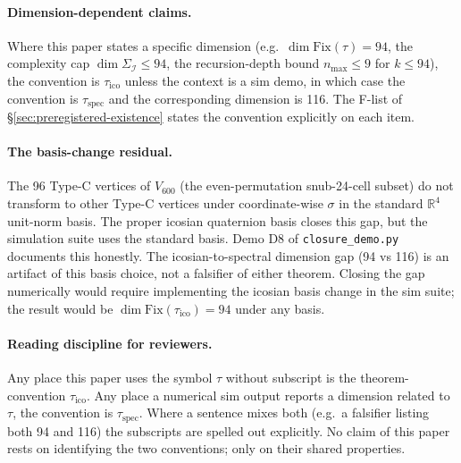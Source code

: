 \documentclass[11pt]{article}
\theoremstyle{plain}
\theoremstyle{definition}
\theoremstyle{remark}
\newcommand{\Ical}{\mathcal{I}}
\begin{document}
\paragraph{Dimension-dependent claims.} Where this paper states a
specific dimension (e.g.\ $\dim \mathrm{Fix}(\tau) = 94$, the
complexity cap $\dim \Sigma_\Ical \leq 94$, the recursion-depth bound
$n_{\max} \leq 9$ for $k \leq 94$), the convention is $\tau_{\mathrm{ico}}$
unless the context is a sim demo, in which case the convention is
$\tau_{\mathrm{spec}}$ and the corresponding dimension is 116. The F-list
of \S\ref{sec:preregistered-existence} states the convention explicitly
on each item.

\paragraph{The basis-change residual.} The 96 Type-C vertices of $V_{600}$
(the even-permutation snub-24-cell subset) do not transform
to other Type-C vertices under coordinate-wise $\sigma$ in the standard
$\mathbb{R}^4$ unit-norm basis. The proper icosian quaternion basis
closes this gap, but the simulation suite uses the standard basis. Demo
D8 of \texttt{closure\_demo.py} documents this honestly. The
icosian-to-spectral dimension gap (94 vs 116) is an artifact of this
basis choice, not a falsifier of either theorem. Closing the gap
numerically would require implementing the icosian basis change in the
sim suite; the result would be $\dim \mathrm{Fix}(\tau_{\mathrm{ico}}) = 94$
under any basis.

\paragraph{Reading discipline for reviewers.} Any place this paper
uses the symbol $\tau$ without subscript is the theorem-convention
$\tau_{\mathrm{ico}}$. Any place a numerical sim output reports a
dimension related to $\tau$, the convention is $\tau_{\mathrm{spec}}$.
Where a sentence mixes both (e.g.\ a falsifier listing both 94 and 116)
the subscripts are spelled out explicitly. No claim of this paper rests
on identifying the two conventions; only on their shared properties.



\end{document}
